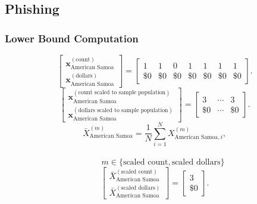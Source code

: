 \subsection{Phishing}\label{sec:phishing}
\subsubsection{Lower Bound Computation}
\[
\begin{bmatrix}
\mathbf{x}_{\text{American Samoa}}^{(\text{count})}\\
\mathbf{x}_{\text{American Samoa}}^{(\text{dollars})}
\end{bmatrix}
=
\begin{bmatrix}
1 & 1 & 0 & 1 & 1 & 1 & 1\\
\$0 &\$0 &\$0 &\$0 &\$0 &\$0 &\$0 
\end{bmatrix}.
\]
\[
\begin{bmatrix}
\mathbf{x}_{\text{American Samoa}}^{(\text{count scaled to sample population})}\\
\mathbf{x}_{\text{American Samoa}}^{(\text{dollars scaled to sample population})}
\end{bmatrix}
=
\begin{bmatrix}
3 & \cdots & 3\\
\$0 & \cdots &\$0
\end{bmatrix}.
\]
  \[
\bar{X}_{\text{American Samoa}}^{(m)}
= \frac{1}{N}\sum_{i=1}^{N} X_{\text{American Samoa},i}^{(m)},
\]
\\
\[
\qquad
m \in \{\text{scaled count},\text{scaled dollars}\}
\]
\[
\begin{bmatrix}
\bar{X}_{\text{American Samoa}}^{(\text{scaled count})}\\
\bar{X}_{\text{American Samoa}}^{(\text{scaled dollars})}
\end{bmatrix}
=
\begin{bmatrix}
3\\
\$0
\end{bmatrix}.
\]
